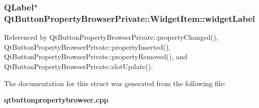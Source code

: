 \subsubsection[{widget\+Label}]{\setlength{\rightskip}{0pt plus 5cm}Q\+Label$\ast$ Qt\+Button\+Property\+Browser\+Private\+::\+Widget\+Item\+::widget\+Label}\label{structQtButtonPropertyBrowserPrivate_1_1WidgetItem_a296819e038e78e743a04dde10ea5b8a5}


Referenced by Qt\+Button\+Property\+Browser\+Private\+::property\+Changed(), Qt\+Button\+Property\+Browser\+Private\+::property\+Inserted(), Qt\+Button\+Property\+Browser\+Private\+::property\+Removed(), and Qt\+Button\+Property\+Browser\+Private\+::slot\+Update().



The documentation for this struct was generated from the following file\+:\begin{DoxyCompactItemize}
\item 
{\bf qtbuttonpropertybrowser.\+cpp}\end{DoxyCompactItemize}
